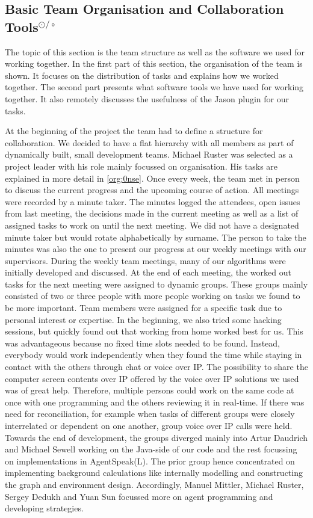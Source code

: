 \subsection[Basic Team Organisation and Collaboration Tools]{Basic Team Organisation and Collaboration Tools$^{\odot/\circ}$}\label{org:general}
The topic of this section is the team structure as well as the software we used for working together.
In the first part of this section, the organisation of the team is shown.
It focuses on the distribution of tasks and explains how we worked together.
The second part presents what software tools we have used for working together.
It also remotely discusses the usefulness of the Jason plugin for our tasks.

At the beginning of the project the team had to define a structure for collaboration.
We decided to have a flat hierarchy with all members as part of dynamically built, small development teams.
Michael Ruster was selected as a project leader with his role mainly focussed on organisation.
His tasks are explained in more detail in \autoref{org:0nse}.
Once every week, the team met in person to discuss the current progress and the upcoming course of action.
All meetings were recorded by a minute taker.
The minutes logged the attendees, open issues from last meeting, the decisions made in the current meeting as well as a list of assigned tasks to work on until the next meeting.
We did not have a designated minute taker but would rotate alphabetically by surname.
The person to take the minutes was also the one to present our progress at our weekly meetings with our supervisors.
During the weekly team meetings, many of our algorithms were initially developed and discussed.
At the end of each meeting, the worked out tasks for the next meeting were assigned to dynamic groups.
These groups mainly consisted of two or three people with more people working on tasks we found to be more important.
Team members were assigned for a specific task due to personal interest or expertise.
In the beginning, we also tried some hacking sessions, but quickly found out that working from home worked best for us.
This was advantageous because no fixed time slots needed to be found.
Instead, everybody would work independently when they found the time while staying in contact with the others through chat or voice over IP.
The possibility to share the computer screen contents over IP offered by the voice over IP solutions we used was of great help.
Therefore, multiple persons could work on the same code at once with one programming and the others reviewing it in real-time.
If there was need for reconciliation, for example when tasks of different groups were closely interrelated or dependent on one another, group voice over IP calls were held.
Towards the end of development, the groups diverged mainly into Artur Daudrich and Michael Sewell working on the Java-side of our code and the rest focussing on implementations in AgentSpeak(L).
The prior group hence concentrated on implementing background calculations like internally modelling and constructing the graph and environment design.
Accordingly, Manuel Mittler, Michael Ruster, Sergey Dedukh and Yuan Sun focussed more on agent programming and developing strategies.

